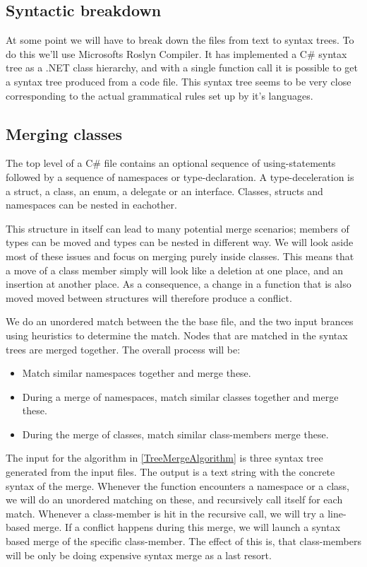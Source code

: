 \documentclass[11pt]{article}
\begin{document}
\subsection{Syntactic breakdown}
At some point we will have to break down the files from text to syntax trees. To do this we'll use Microsofts Roslyn Compiler. It has implemented a C\# syntax tree as a .NET class hierarchy, and with a single function call it is possible to get a syntax tree produced from a code file. This syntax tree seems to be very close corresponding to the actual grammatical rules set up by it's languages.



\subsection{Merging classes}
\label{mergingclasses}
The top level of a C\# file contains an optional sequence of using-statements followed by a sequence of namespaces or type-declaration. A type-deceleration is a struct, a class, an enum, a delegate or an interface. Classes, structs and namespaces can be nested in eachother.

This structure in itself can lead to many potential merge scenarios; members of types can be moved and types can be nested in different way. We will look aside most of these issues and focus on merging purely inside classes. This means that a move of a class member simply will look like a deletion at one place, and an insertion at another place. As a consequence, a change in a function that is also moved moved between structures will therefore produce a conflict.

We do an unordered match between the the base file, and the two input brances using heuristics to determine the match. Nodes that are matched in the syntax trees are merged together. The overall process will be:

\begin{itemize}
   \item Match similar namespaces together and merge these.
   \item During a merge of namespaces, match similar classes together and merge these.
   \item During the merge of classes, match similar class-members merge these.
\end{itemize}

The input for the algorithm in \ref{TreeMergeAlgorithm} is three syntax tree generated from the input files. The output is a text string with the concrete syntax of the merge. Whenever the function encounters a namespace or a class, we will do an unordered matching on these, and recursively call itself for each match. Whenever a class-member is hit in the recursive call, we will try a line-based merge. If a conflict happens during this merge, we will launch a syntax based merge of the specific class-member. The effect of this is, that class-members will be only be doing expensive syntax merge as a last resort.
\end{document}
